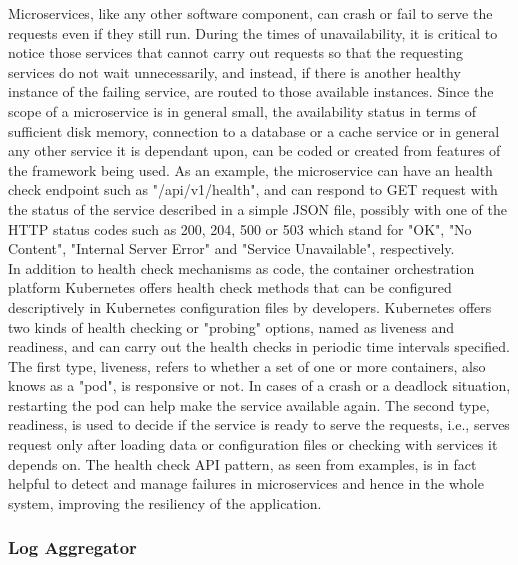\documentclass{Configuration_Files/PoliMi3i_thesis}
\begin{document}
Microservices, like any other software component, can crash or fail to serve the requests even if they still run.
During the times of unavailability, it is critical to notice those services that cannot carry out requests so that the requesting services do not wait unnecessarily, and instead, if there is another healthy instance of the failing service, are routed to those available instances.
Since the scope of a microservice is in general small, the availability status in terms of sufficient disk memory, connection to a database or a cache service or in general any other service it is dependant upon, can be coded or created from features of the framework being used.
As an example, the microservice can have an health check endpoint such as "/api/v1/health", and can respond to GET request with the status of the service described in a simple JSON file, possibly with one of the HTTP status codes such as 200, 204, 500 or 503 which stand for "OK", "No Content", "Internal Server Error" and "Service Unavailable", respectively.
\\
In addition to health check mechanisms as code, the container orchestration platform Kubernetes offers health check methods that can be configured descriptively in Kubernetes configuration files by developers.
Kubernetes offers two kinds of health checking or "probing" options, named as liveness and readiness, and can carry out the health checks in periodic time intervals specified.
The first type, liveness, refers to whether a set of one or more containers, also knows as a "pod", is responsive or not.
In cases of a crash or a deadlock situation, restarting the pod can help make the service available again.
The second type, readiness, is used to decide if the service is ready to serve the requests, i.e., serves request only after loading data or configuration files or checking with services it depends on.
The health check API pattern, as seen from examples, is in fact helpful to detect and manage failures in microservices and hence in the whole system, improving the resiliency of the application.

\subsubsection{Log Aggregator}
\label{subsubsec:log_aggregator}
\end{document}
